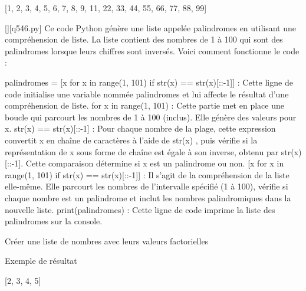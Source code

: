 [1, 2, 3, 4, 5, 6, 7, 8, 9, 11, 22, 33, 44, 55, 66, 77, 88, 99]
        \par
        \begin{solution}
            \renewcommand{\nomfichier}{q546.py}
            \pythonfile{\chemincode \nomfichier}[][\nomfichier]
            Ce code Python génère une liste appelée palindromes en utilisant une compréhension de liste. La liste contient des nombres de 1 à 100 qui sont des palindromes lorsque leurs chiffres sont inversés. Voici comment fonctionne le code :

    palindromes = [x for x in range(1, 101) if str(x) == str(x)[::-1]] : Cette ligne de code initialise une variable nommée palindromes et lui affecte le résultat d'une compréhension de liste.
        for x in range(1, 101) : Cette partie met en place une boucle qui parcourt les nombres de 1 à 100 (inclus). Elle génère des valeurs pour x.
        str(x) == str(x)[::-1] : Pour chaque nombre de la plage, cette expression convertit x en chaîne de caractères à l'aide de str(x) , puis vérifie si la représentation de x sous forme de chaîne est égale à son inverse, obtenu par str(x)[::-1]. Cette comparaison détermine si x est un palindrome ou non.
        [x for x in range(1, 101) if str(x) == str(x)[::-1]] : Il s'agit de la compréhension de la liste elle-même. Elle parcourt les nombres de l'intervalle spécifié (1 à 100), vérifie si chaque nombre est un palindrome et inclut les nombres palindromiques dans la nouvelle liste.
    print(palindromes) : Cette ligne de code imprime la liste des palindromes sur la console.
        \end{solution}
        

        \question
        Créer une liste de nombres avec leurs valeurs factorielles

Exemple de résultat

[2, 3, 4, 5]

